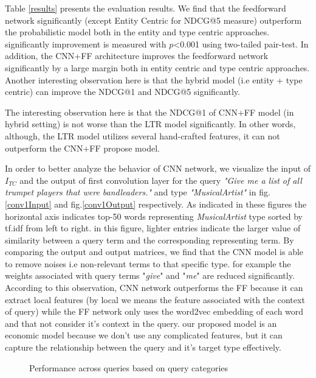 Table \ref{results} presents the evaluation results. We find that the feedforward network significantly (except Entity Centric for NDCG@5 measure) outperform the probabilistic model both in the entity and type centric approaches. significantly improvement is measured with $p$<0.001 using two-tailed pair-test. In addition, the CNN+FF architecture improves the feedforward network significantly by a large margin both in entity centric and type centric approaches. Another interesting observation here is that the hybrid model (i.e entity + type centric) can improve the NDCG@1 and NDCG@5 significantly.

The interesting observation here is that the NDCG@1 of CNN+FF model (in hybrid setting) is not worse than the LTR model significantly. In other words, although, the LTR model utilizes several hand-crafted features, it can not outperform the CNN+FF propose model.

In order to better analyze the behavior of CNN network, we visualize the input of $I_{TC}$ and the output of first convolution layer for the query \textit{"Give me a list of all trumpet players that were bandleaders."} and type \textit{"MusicalArtist"} in fig.\ref{conv1Input} and fig.\ref{conv1Output} respectively. As indicated in these figures the horizontal axis indicates top-50 words representing \textit{MusicalArtist} type sorted by tf.idf from left to right. in this figure, lighter entries indicate the larger value of similarity between a query term and the corresponding representing term. By comparing the output and output matrices, we find that the CNN model is able to remove noises i.e non-relevant terms to that specific type. for example the weights associated with query terms "\textit{give}" and "\textit{me}" are reduced significantly. According to this observation, CNN network outperforms the FF because it can extract local features (by local we means the feature associated with the context of query) while the FF network only uses the word2vec embedding of each word and that not consider it's context in the query. our proposed model is an economic model because we don't use any complicated features, but it can capture the relationship between the query and it's target type effectively.     





\begin{figure}
	
	\caption{Performance across queries based on query categories}

\end{figure}

